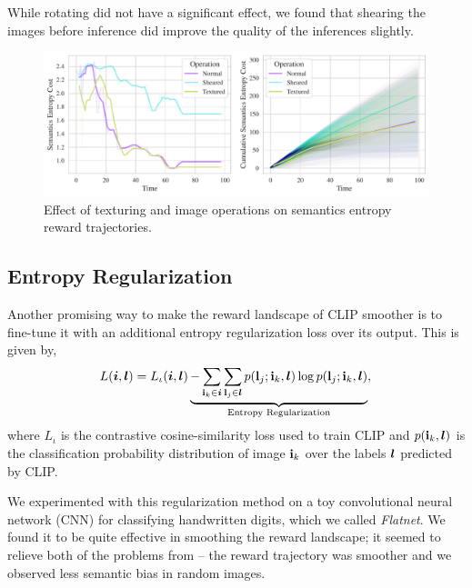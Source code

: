 While rotating did not have a significant effect, we found that shearing the images before inference did improve the quality of the inferences slightly.

\begin{figure}[H]
    \centering
    \includegraphics[width=\textwidth]{images/texturing_operations_comparison.pdf}
    \caption{Effect of texturing and image operations on semantics entropy reward trajectories.}
    \label{fig:texturing-operations}
\end{figure}



\subsection{Entropy Regularization}
\label{sec:entropy-regularization}
Another promising way to make the reward landscape of CLIP smoother is to fine-tune it with an additional entropy regularization loss over its output.
This is given by,
\begin{equation}
    \label{eq:entropy-regularization}
    L(\bm{i}, \bm{l}) = L_{\iota}(\bm{i}, \bm{l}) \underbrace{- \sum_{\mathbf{i}_k \in \bm{i}}\sum_{\mathbf{l}_j \in \bm{l}} p(\mathbf{l}_j; \mathbf{i}_k, \bm{l}) \log p(\mathbf{l}_j; \mathbf{i}_k, \bm{l})}_{\text{Entropy Regularization}},\\
\end{equation}
where \(L_{\iota}\) is the contrastive cosine-similarity loss used to train CLIP and \(p(\mathbf{i}_k, \bm{l})\) is the classification probability distribution of image \(\mathbf{i}_k\) over the labels \(\bm{l}\) predicted by CLIP.

We experimented with this regularization method on a toy convolutional neural network (CNN) for classifying handwritten digits, which we called \emph{Flatnet}.
We found it to be quite effective in smoothing the reward landscape; it seemed to relieve both of the problems from  -- the reward trajectory was smoother and we observed less semantic bias in random images.

